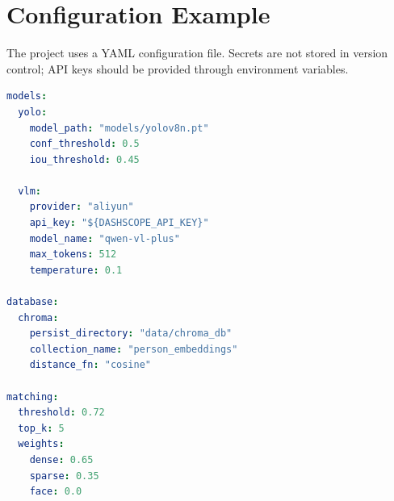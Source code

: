 \chapter{Configuration Example}
\label{app:configuration}

The project uses a YAML configuration file. Secrets are not stored in version control; API keys should be provided through environment variables.

\begin{lstlisting}[language=yaml]
models:
  yolo:
    model_path: "models/yolov8n.pt"
    conf_threshold: 0.5
    iou_threshold: 0.45

  vlm:
    provider: "aliyun"
    api_key: "${DASHSCOPE_API_KEY}"
    model_name: "qwen-vl-plus"
    max_tokens: 512
    temperature: 0.1

database:
  chroma:
    persist_directory: "data/chroma_db"
    collection_name: "person_embeddings"
    distance_fn: "cosine"

matching:
  threshold: 0.72
  top_k: 5
  weights:
    dense: 0.65
    sparse: 0.35
    face: 0.0
\end{lstlisting}
